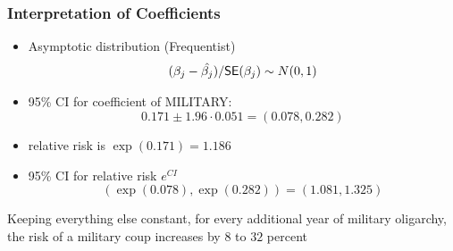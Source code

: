 \documentclass[handout]{beamer}\usepackage[]{graphicx}\usepackage[]{color}
\begin{document}
\begin{frame}[fragile]\frametitle{Interpretation of Coefficients}

  \begin{itemize}
  \item Asymptotic distribution (Frequentist)
$$(\beta_j - \hat{\beta_j})/\textsf{SE}(\beta_j) \sim N(0,1)$$  \pause
  \item 95\% CI for coefficient of MILITARY:
   $$0.171 \pm 1.96 \cdot 0.051  = (
   0.078, 0.282)$$  \pause
  \item relative risk is $\exp(0.171) = 1.186$  \pause
  \item  95\% CI for relative risk  $e^{CI}$
$$ (\exp(0.078), \exp(0.282))  =
(1.081, 1.325)$$
  \end{itemize}

Keeping everything else constant, for every additional year of military oligarchy, the risk of a
military coup increases by $8$ to $32$ percent

\end{frame}
\end{document}
